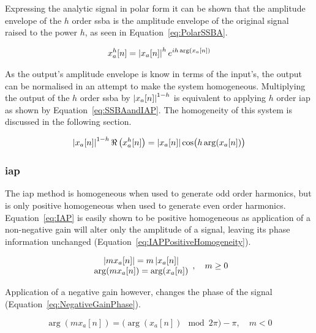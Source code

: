 			Expressing the analytic signal in polar form it can be shown that the amplitude envelope of the
			$h$ order \acrshort{ssba} is the amplitude envelope of the original signal raised to the
			power $h$, as seen in Equation~\ref{eq:PolarSSBA}.

			\begin{gather}
				x_{a}^{h}[n] = \left|x_{a}[n]\right|^{h} e^{ih\arg (x_{a}[n])}
				\label{eq:PolarSSBA}
			\end{gather}

			As the output's amplitude envelope is know in terms of the input's, the output can be normalised in
			an attempt to make the system homogeneous. Multiplying the output of the $h$ order
			\acrshort{ssba} by $\left|x_{a}[n]\right|^{1-h}$ is equivalent to applying $h$ order
			\acrshort{iap} as shown by Equation~\ref{eq:SSBAandIAP}. The homogeneity of this system is
			discussed in the following section.

			\begin{equation}
				\left|x_{a}[n]\right|^{1-h} \Re \left( x_{a}^{h}[n] \right) = 
				\left|x_{a}[n]\right| \cos \bigl( h\arg(x_{a}[n]) \bigr)
				\label{eq:SSBAandIAP}
			\end{equation}

		\subsubsection*{\acrshort{iap}}
			The \acrshort{iap} method is homogeneous when used to generate odd order harmonics, but is only
			positive homogeneous when used to generate even order harmonics. Equation~\ref{eq:IAP} is easily
			shown to be positive homogeneous as application of a non-negative gain will alter only the
			amplitude of a signal, leaving its phase information unchanged
			(Equation~\ref{eq:IAPPositiveHomogeneity}).

			\begin{equation}
				\begin{array}{c}
					\left|mx_{a}[n]\right| = m\left|x_{a}[n]\right| \\
					\arg(mx_{a}[n]) = \arg(x_{a}[n])
				\end{array}
				, \quad m \geq 0
				\label{eq:IAPPositiveHomogeneity}
			\end{equation}

			Application of a negative gain however, changes the phase of the signal
			(Equation~\ref{eq:NegativeGainPhase}).
						
			\begin{equation}
				\arg(mx_{a}[n]) = \bigl( \arg(x_{a}[n]) \mod 2\pi \bigr) - \pi, \quad m < 0
				\label{eq:NegativeGainPhase}
			\end{equation}

